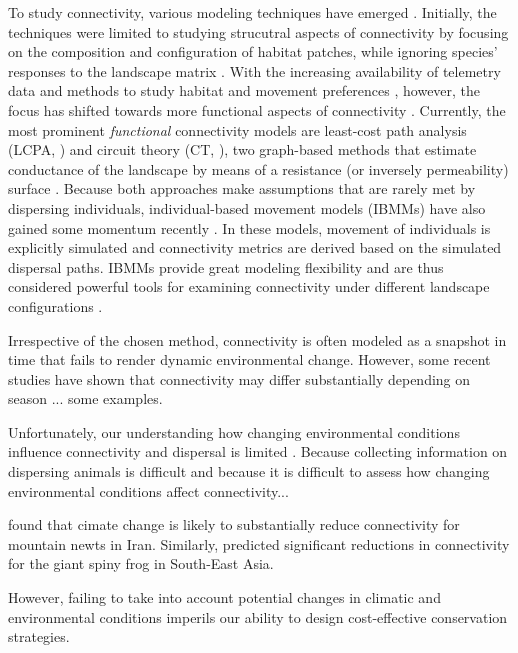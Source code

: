\documentclass[abstract=on,10pt,a4paper,bibliography=totocnumbered]{article}
\begin{document}
To study connectivity, various modeling techniques have emerged
\cite{Etherington.2016, Diniz.2019}. Initially, the techniques were limited to
studying strucutral aspects of connectivity by focusing on the composition and
configuration of habitat patches, while ignoring species' responses to the
landscape matrix \citep{Tischendorf.2000, Doerr.2011}. With the increasing
availability of telemetry data and methods to study habitat and movement
preferences \citep{Boyce.2002, Fortin.2009, Cushmann.2010, Avgar.2016}, however,
the focus has shifted towards more functional aspects of connectivity
\citep{Tischendorf.2000, Doerr.2011}. Currently, the most prominent
\textit{functional} connectivity models are least-cost path analysis (LCPA,
\citealp{Adriaensen.2003}) and circuit theory (CT, \citealp{McRae.2008}), two
graph-based methods that estimate conductance of the landscape by means of a
resistance (or inversely permeability) surface \citep{Zeller.2012}. Because both
approaches make assumptions that are rarely met by dispersing individuals,
individual-based movement models (IBMMs) have also gained some momentum recently
\citep{Kanagaraj.2013, Allen.2016, Hauenstein.2019, Diniz.2019, Zeller.2020,
Unnithan.2021, Unnithan.2022, Hofmann.2022}. In these models, movement of
individuals is explicitly simulated and connectivity metrics are derived based
on the simulated dispersal paths. IBMMs provide great modeling flexibility and
are thus considered powerful tools for examining connectivity under different
landscape configurations \citep{Littlefield.2019}.

Irrespective of the chosen method, connectivity is often modeled as a snapshot
in time that fails to render dynamic environmental change. However, some recent
studies have shown that connectivity may differ substantially depending on
season ... some examples.

 Unfortunately, our
understanding how changing environmental conditions influence connectivity and
dispersal is limited \citep{Kokko.2006, Travis.2013}. Because collecting
information on dispersing animals is difficult and because it is difficult to
assess how changing environmental conditions affect connectivity...

\cite{Ashrafzadeh.2019} found that cimate change is likely to substantially
reduce connectivity for mountain newts in Iran. Similarly, \cite{Luo.2021}
predicted significant reductions in connectivity for the giant spiny frog in
South-East Asia.

However, failing to take into account potential changes in climatic and
environmental conditions imperils our ability to design cost-effective
conservation strategies.
\end{document}
